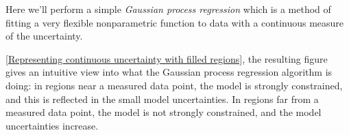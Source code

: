 Here we’ll perform a simple \emph{Gaussian process regression} which is a method of fitting a very flexible nonparametric function to data with a continuous measure of the uncertainty.


\autoref{Representing continuous uncertainty with filled regions}, the resulting figure gives an intuitive view into what the Gaussian process regression
algorithm is doing: in regions near a measured data point, the model is strongly constrained, and this is reflected in the small model uncertainties. In regions far from a
measured data point, the model is not strongly constrained, and the model uncertainties increase.


